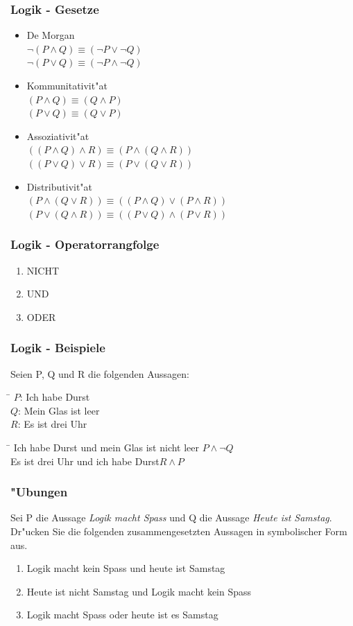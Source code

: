 \documentclass{beamer}
\begin{document}
\frame
{
	\frametitle{Logik - Gesetze}
	{\small
	\begin{itemize}
	\item De Morgan\\
	$\lnot (P \land Q) \equiv (\lnot P \lor \lnot Q)$\\
	$\lnot (P \lor Q) \equiv (\lnot P \land \lnot Q)$
	\item Kommunitativit"at\\
	$(P \land Q) \equiv (Q \land P)$\\
	$(P \lor Q) \equiv (Q \lor P)$
	\item Assoziativit"at\\
	$((P \land Q) \land R) \equiv (P \land (Q \land R))$\\
	$((P \lor Q) \lor R) \equiv (P \lor (Q \lor R))$
	\item Distributivit"at\\
	$(P \land (Q \lor R)) \equiv ((P \land Q) \lor (P \land R))$\\
	$(P \lor (Q \land R)) \equiv ((P \lor Q) \land (P \lor R))$
	\end{itemize}
	}
}

\frame
{
	\frametitle{Logik - Operatorrangfolge}
	\begin{enumerate}
	\item NICHT
	\item UND
	\item ODER
	\end{enumerate}
}

\frame
{
	\frametitle{Logik - Beispiele}
	Seien P, Q und R die folgenden Aussagen:\\
	\begin{tabbing}
	\hspace{2cm} \= \kill
	$P$: \> Ich habe Durst\\
	$Q$: \> Mein Glas ist leer\\
	$R$: \> Es ist drei Uhr
	\end{tabbing}
	{\small
	\begin{tabbing}
	\hspace{8cm} \= \kill
	Ich habe Durst und mein Glas ist nicht leer\> $P \land \lnot Q$\\
	Es ist drei Uhr und ich habe Durst\>$R \land P$\\
	\end{tabbing}
	}
}


\frame
{
	\frametitle{"Ubungen}
	Sei P die Aussage \emph{Logik macht Spass} und Q die Aussage \emph{Heute ist Samstag}.
	Dr"ucken Sie die folgenden zusammengesetzten Aussagen in symbolischer Form
	aus.
	\begin{enumerate}
	\item Logik macht kein Spass und heute ist Samstag
	\item Heute ist nicht Samstag und Logik macht kein Spass
	\item Logik macht Spass oder heute ist es Samstag
	\end{enumerate}
}
\end{document}
